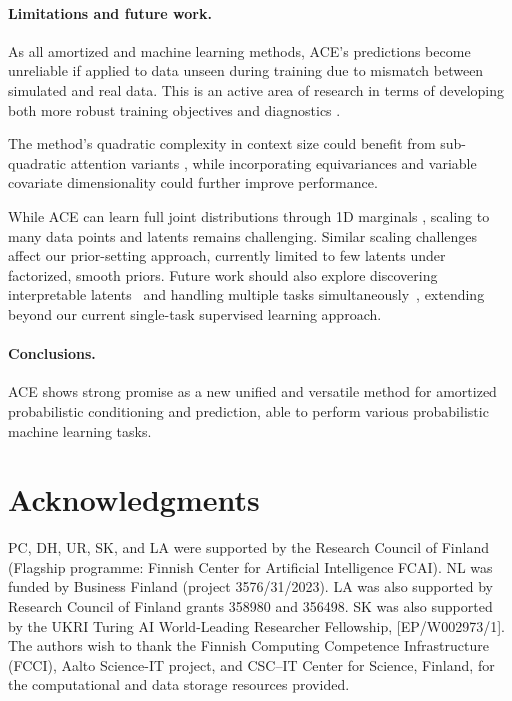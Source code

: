 \documentclass[twoside]{article}
\begin{document}
\vspace{-0.25em}
\paragraph{Limitations and future work.}

As all amortized and machine learning methods, ACE's predictions become unreliable if applied to data unseen during training due to mismatch between simulated and real data. This is an active area of research in terms of developing both more robust training objectives \citep{huang2024learning} and diagnostics \citep{schmitt2023detecting}.

The method's quadratic complexity in context size could benefit from sub-quadratic attention variants \citep{feng2023latent}, while incorporating equivariances \citep{huang2023practical} and variable covariate dimensionality \citep{liu2020task, dutordoir2023neural,muller2023pfns4bo} could further improve performance.

While ACE can learn full joint distributions through 1D marginals \citep{bruinsma2023autoregressive}, scaling to many data points and latents remains challenging. 
Similar scaling challenges affect our prior-setting approach, currently limited to few latents under factorized, smooth priors.
Future work should also explore discovering interpretable latents~\citep{mittal2024does} and handling multiple tasks simultaneously~\citep{kim2022multi,ashman2024context}, extending beyond our current single-task supervised learning approach.


\vspace{-0.25em}
\paragraph{Conclusions.} ACE shows strong promise as a new unified and versatile method for amortized probabilistic conditioning and prediction, able to perform various probabilistic machine learning tasks.


\section*{Acknowledgments}

PC, DH, UR, SK, and LA were supported by the Research Council of Finland (Flagship programme: Finnish Center for Artificial Intelligence FCAI). NL was funded by Business Finland (project 3576/31/2023). LA was also supported by Research Council of Finland grants 358980 and 356498. SK was also supported by the UKRI Turing AI World-Leading Researcher Fellowship, [EP/W002973/1].
The authors wish to thank the Finnish Computing Competence Infrastructure (FCCI), Aalto Science-IT project, and CSC–IT Center for Science, Finland, for
the computational and data storage resources provided.
\end{document}
